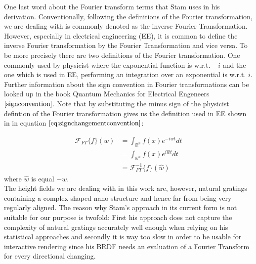 \label{sec:electricalengeneeringftconvention}
\noindent
One last word about the Fourier transform terms that Stam uses in his derivation. Conventionally, following the definitions of the Fourier transformation, we are dealing with is commonly denoted as the inverse Fourier Transformation. However, especially in electrical engineering (EE), it is common to define the inverse Fourier transformation by the Fourier Transformation and vice versa. To be more precisely there are two definitions of the Fourier transformation. One commonly used by physicist where the exponential function is w.r.t. $-i$ and the one which is used in EE, performing an integration over an exponential is w.r.t. $i$. Further information about the sign convention in Fourier transformations can be looked up in the book Quantum Mechanics for Electrical Engeneers$\cite{signconvention}$. Note that by substituting the minus sign of the physicist defintion of the Fourier transformation gives us the definition used in EE shown in in equation $\ref{eq:signchangementconvention}$:

\begin{align}
\mathcal{F}_{FT}\{f\}(w) 
& = \int_{\mathds{R}^n} f(x)e^{-iwt} dt \nonumber\\
& = \int_{\mathds{R}^n} f(x)e^{i\hat{w}t} dt \nonumber\\
& = \mathcal{F}^{-1}_{FT}\{f\}(\hat{w})
\label{eq:signchangementconvention}
\end{align} 
where $\hat{w}$ is equal $-w$. \\

The height fields we are dealing with in this work are, however, natural gratings containing a complex shaped nano-structure and hence far from being very regularly aligned. The reason why Stam's approach in its current form is not suitable for our purpose is twofold: First his approach does not capture the complexity of natural gratings accurately well enough when relying on his statistical approaches and secondly it is way too slow in order to be usable for interactive rendering since his BRDF needs an evaluation of a Fourier Transform for every directional changing. \\